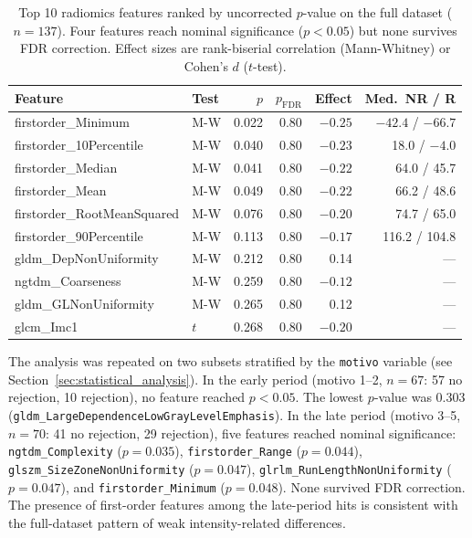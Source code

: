 \begin{appendices}
\begin{table}[ht]
\centering
\caption{Top 10 radiomics features ranked by uncorrected $p$-value on the full dataset ($n = 137$). Four features reach nominal significance ($p < 0.05$) but none survives FDR correction. Effect sizes are rank-biserial correlation (Mann-Whitney) or Cohen's $d$ ($t$-test).}
\label{tab:radiomics_top10}
\begin{tabular}{llrrrr}
\toprule
Feature & Test & $p$ & $p_{\text{FDR}}$ & Effect & Med.\ NR / R \\
\midrule
firstorder\_Minimum & M-W & 0.022 & 0.80 & $-0.25$ & $-42.4$ / $-66.7$ \\
firstorder\_10Percentile & M-W & 0.040 & 0.80 & $-0.23$ & 18.0 / $-4.0$ \\
firstorder\_Median & M-W & 0.041 & 0.80 & $-0.22$ & 64.0 / 45.7 \\
firstorder\_Mean & M-W & 0.049 & 0.80 & $-0.22$ & 66.2 / 48.6 \\
firstorder\_RootMeanSquared & M-W & 0.076 & 0.80 & $-0.20$ & 74.7 / 65.0 \\
firstorder\_90Percentile & M-W & 0.113 & 0.80 & $-0.17$ & 116.2 / 104.8 \\
gldm\_DepNonUniformity & M-W & 0.212 & 0.80 & 0.14 & --- \\
ngtdm\_Coarseness & M-W & 0.259 & 0.80 & $-0.12$ & --- \\
gldm\_GLNonUniformity & M-W & 0.265 & 0.80 & 0.12 & --- \\
glcm\_Imc1 & $t$ & 0.268 & 0.80 & $-0.20$ & --- \\
\bottomrule
\end{tabular}
\end{table}

The analysis was repeated on two subsets stratified by the \texttt{motivo} variable (see Section~\ref{sec:statistical_analysis}). In the early period (motivo 1--2, $n = 67$: 57 no rejection, 10 rejection), no feature reached $p < 0.05$. The lowest $p$-value was 0.303 (\texttt{gldm\_LargeDependenceLowGrayLevelEmphasis}). In the late period (motivo 3--5, $n = 70$: 41 no rejection, 29 rejection), five features reached nominal significance: \texttt{ngtdm\_Complexity} ($p = 0.035$), \texttt{firstorder\_Range} ($p = 0.044$), \texttt{glszm\_SizeZoneNonUniformity} ($p = 0.047$), \texttt{glrlm\_RunLengthNonUniformity} ($p = 0.047$), and \texttt{firstorder\_Minimum} ($p = 0.048$). None survived FDR correction. The presence of first-order features among the late-period hits is consistent with the full-dataset pattern of weak intensity-related differences.


\end{appendices}
